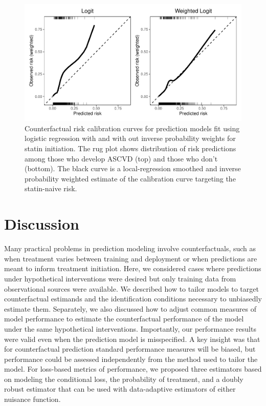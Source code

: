 \begin{figure}[p]
    \centering
    \includegraphics{../3_figures/calib.pdf}
    \caption{Counterfactual risk calibration curves for prediction models fit using logistic regression with and with out inverse probability weights for statin initiation. The rug plot shows distribution of risk predictions among those who develop ASCVD (top) and those who don't (bottom). The black curve is a local-regression smoothed and inverse probability weighted estimate of the calibration curve targeting the statin-naive risk.\label{fig:calib}}
\end{figure}

\section{Discussion} \label{sec:discussion}
Many practical problems in prediction modeling involve counterfactuals, such as when treatment varies between training and deployment or when predictions are meant to inform treatment initiation. Here, we considered cases where predictions under hypothetical interventions were desired but only training data from observational sources were available. We described how to tailor models to target counterfactual estimands and the identification conditions necessary to unbiasedly estimate them. Separately, we also discussed how to adjust common measures of model performance to estimate the counterfactual performance of the model under the same hypothetical interventions. Importantly, our performance results were valid even when the prediction model is misspecified. A key insight was that for counterfactual prediction standard performance measures will be biased, but performance could be assessed independently from the method used to tailor the model. For loss-based metrics of performance, we proposed three estimators based on modeling the conditional loss, the probability of treatment, and a doubly robust estimator that can be used with data-adaptive estimators of either nuisance function. 

